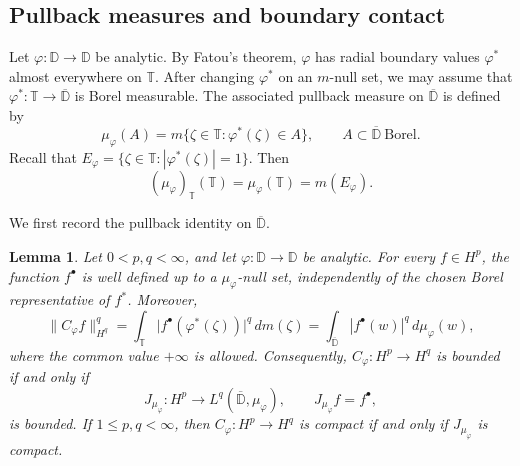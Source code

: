 \documentclass[10pt,a4paper]{amsart}
\newtheorem{lemma}[theorem]{Lemma}
\newcommand{\D}{\mathbb{D}}
\newcommand{\T}{\mathbb{T}}
\begin{document}
\subsection{Pullback measures and boundary contact}
\label{subsec:pullback}

Let \(\varphi:\D\to\D\) be analytic. By Fatou's theorem,
\(\varphi\) has radial boundary values \(\varphi^*\) almost everywhere
on \(\T\). After changing \(\varphi^*\) on an \(m\)-null set, we may
assume that
\(
        \varphi^*:\T\longrightarrow\overline{\D}
\)
is Borel measurable. The associated pullback measure on
\(\overline{\D}\) is defined by
\[
        \mu_\varphi(A)
        =
        m\{\zeta\in\T:\varphi^*(\zeta)\in A\},
        \qquad
        A\subset\overline{\D}\ \text{Borel}.
\]
Recall that
\(E_\varphi=\{\zeta\in\T:|\varphi^*(\zeta)|=1\}\). Then
\begin{equation}
\label{eq:boundary-mass}
        (\mu_\varphi)_\T(\T)
        =
        \mu_\varphi(\T)
        =
        m(E_\varphi).
\end{equation}

We first record the pullback identity on \(\overline{\D}\).

\begin{lemma}
\label{lem:pullback-id}
Let \(0<p,q<\infty\), and let \(\varphi:\D\to\D\) be analytic. For
every \(f\in H^p\), the function \(f^\bullet\) is well defined up to a
\(\mu_\varphi\)-null set, independently of the chosen Borel
representative of \(f^*\). Moreover,
\[
        \|C_\varphi f\|_{H^q}^q
        =
        \int_\T
        \bigl|f^\bullet(\varphi^*(\zeta))\bigr|^q\,dm(\zeta)
        =
        \int_{\overline{\D}}
        |f^\bullet(w)|^q\,d\mu_\varphi(w),
\]
where the common value \(+\infty\) is allowed. Consequently,
\(C_\varphi:H^p\to H^q\) is bounded if and only if
\[
        J_{\mu_\varphi}:H^p
        \longrightarrow
        L^q(\overline{\D},\mu_\varphi),
        \qquad
        J_{\mu_\varphi}f=f^\bullet,
\]
is bounded. If \(1\le p,q<\infty\), then
\(C_\varphi:H^p\to H^q\) is compact if and only if
\(J_{\mu_\varphi}\) is compact.
\end{lemma}
\end{document}
